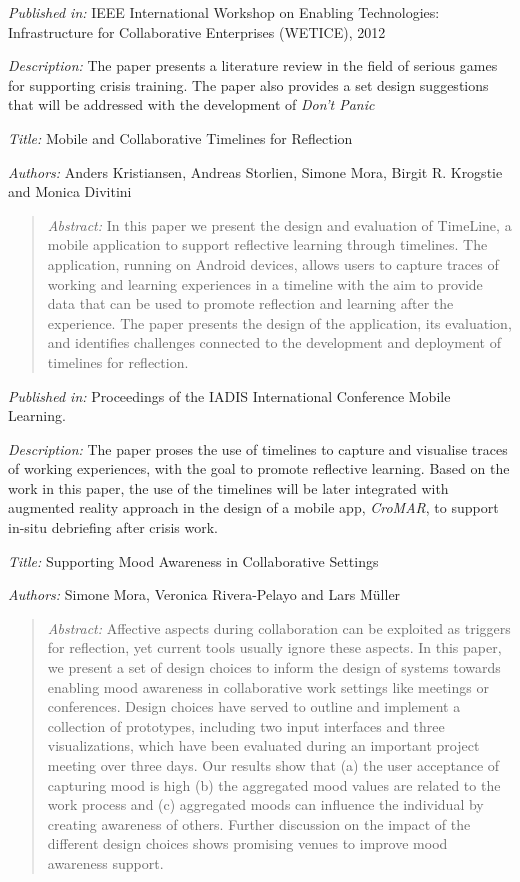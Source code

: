 \emph{Published in: }IEEE International Workshop on Enabling Technologies: Infrastructure for Collaborative Enterprises (WETICE), 2012

\emph{Description: }The paper presents a literature review in the field of serious games for supporting crisis training. The paper also provides a set design suggestions that will be addressed with the development of \emph{Don't Panic}


\emph{Title: }Mobile and Collaborative Timelines for Reflection

\emph{Authors: }Anders Kristiansen, Andreas Storlien, Simone Mora, Birgit R. Krogstie and Monica Divitini

\begin{quote}
	\emph{Abstract: }In this paper we present the design and evaluation of TimeLine, a mobile application to support reflective learning through timelines. The application, running on Android devices, allows users to capture traces of working and learning experiences in a timeline with the aim to provide data that can be used to promote reflection and learning after the experience. The paper presents the design of the application, its evaluation, and identifies challenges connected to the development and deployment of timelines for reflection.
	
\end{quote}

\emph{Published in: }Proceedings of the IADIS International Conference Mobile Learning. 

\emph{Description: }The paper proses the use of timelines to capture and visualise traces of working experiences, with the goal to promote reflective learning. Based on the work in this paper, the use of the timelines will be later integrated with augmented reality approach in the design of a mobile app, \emph{CroMAR}, to support in-situ debriefing after crisis work.


\emph{Title: }Supporting Mood Awareness in Collaborative Settings

\emph{Authors: }Simone Mora, Veronica Rivera-Pelayo and Lars Müller

\begin{quote}
	\emph{Abstract: }Affective aspects during collaboration can be exploited as triggers for reflection, yet current tools usually ignore these aspects. In this paper, we present a set of design choices to inform the design of systems towards enabling mood awareness in collaborative work settings like meetings or conferences. Design choices have served to outline and implement a collection of prototypes, including two input interfaces and three visualizations, which have been evaluated during an important project meeting over three days. Our results show that (a) the user acceptance of capturing mood is high (b) the aggregated mood values are related to the work process and (c) aggregated moods can influence the individual by creating awareness of others. Further discussion on the impact of the different design choices shows promising venues to improve mood awareness support.
	
\end{quote}

